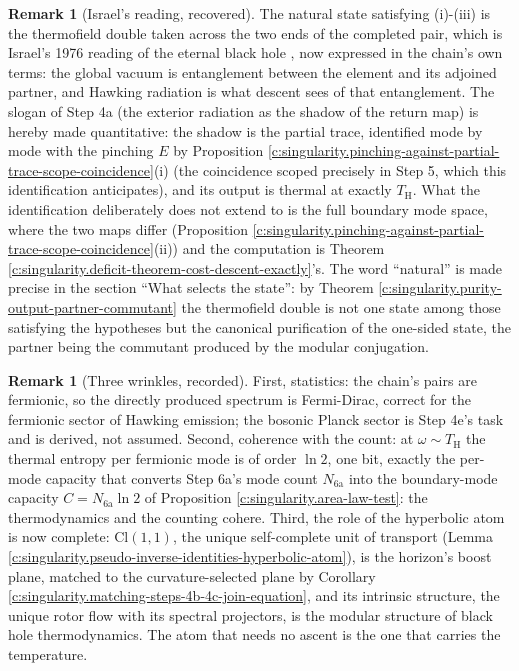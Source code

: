\documentclass[11pt]{article}
\theoremstyle{definition}
\newtheorem{remark}[theorem]{Remark}
\theoremstyle{plain}
\providecommand{\Cl}{}\renewcommand{\Cl}{\mathrm{Cl}}
\providecommand{\TH}{}\renewcommand{\TH}{T_{\mathrm{H}}}
\begin{document}
\begin{remark}[Israel's reading, recovered]\label{c:note.singularity.israels-reading-recovered}
The natural state satisfying (i)-(iii) is the thermofield double taken across the two ends of the completed pair, which is Israel's 1976 reading of the eternal black hole \cite{Israel1976}, now expressed in the chain's own terms: the global vacuum is entanglement between the element and its adjoined partner, and Hawking radiation is what descent sees of that entanglement. The slogan of Step 4a (the exterior radiation as the shadow of the return map) is hereby made quantitative: the shadow is the partial trace, identified mode by mode with the pinching $E$ by Proposition \ref{c:singularity.pinching-against-partial-trace-scope-coincidence}(i) (the coincidence scoped precisely in Step 5, which this identification anticipates), and its output is thermal at exactly $\TH$. What the identification deliberately does not extend to is the full boundary mode space, where the two maps differ (Proposition \ref{c:singularity.pinching-against-partial-trace-scope-coincidence}(ii)) and the computation is Theorem \ref{c:singularity.deficit-theorem-cost-descent-exactly}'s. The word ``natural'' is made precise in the section ``What selects the state'': by Theorem \ref{c:singularity.purity-output-partner-commutant} the thermofield double is not one state among those satisfying the hypotheses but the canonical purification of the one-sided state, the partner being the commutant produced by the modular conjugation.
\end{remark}

\begin{remark}[Three wrinkles, recorded]\label{c:note.singularity.three-wrinkles-recorded}
First, statistics: the chain's pairs are fermionic, so the directly produced spectrum is Fermi-Dirac, correct for the fermionic sector of Hawking emission; the bosonic Planck sector is Step 4e's task and is derived, not assumed. Second, coherence with the count: at $\omega \sim \TH$ the thermal entropy per fermionic mode is of order $\ln 2$, one bit, exactly the per-mode capacity that converts Step 6a's mode count $N_{\mathrm{6a}}$ into the boundary-mode capacity $C = N_{\mathrm{6a}}\ln 2$ of Proposition \ref{c:singularity.area-law-test}: the thermodynamics and the counting cohere. Third, the role of the hyperbolic atom is now complete: $\Cl(1,1)$, the unique self-complete unit of transport (Lemma \ref{c:singularity.pseudo-inverse-identities-hyperbolic-atom}), is the horizon's boost plane, matched to the curvature-selected plane by Corollary \ref{c:singularity.matching-steps-4b-4c-join-equation}, and its intrinsic structure, the unique rotor flow with its spectral projectors, is the modular structure of black hole thermodynamics. The atom that needs no ascent is the one that carries the temperature.
\end{remark}
\end{document}

